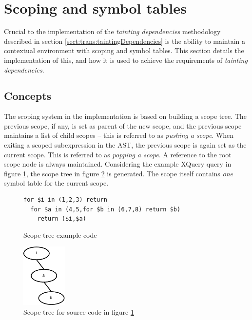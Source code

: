 \section{Scoping and symbol tables}
Crucial to the implementation of the \textit{tainting dependencies} methodology
described in section \ref{sect:trans:taintingDependencies} is the ability to
maintain a contextual environment with scoping and symbol tables. This section
details the implementation of this, and how it is used to achieve the
requirements of \textit{tainting dependencies}.

\subsection{Concepts}
The scoping system in the implementation is based on building a scope tree. The
previous scope, if any, is set as parent of the new scope, and the previous
scope maintains a list of child scopes -- this is referred to as
\textit{pushing a scope}. When exiting a scoped subexpression in the AST, the
previous scope is again set as the current scope. This is referred to as
\textit{popping a scope}. A reference to the root scope node is always
maintained. Considering the example XQuery query in figure
\ref{fig:impl:scope_tree_ex_code}, the scope tree in figure
\ref{fig:impl:scope_tree_ex} is generated. The scope itself contains \emph{one}
symbol table for the current scope.

\begin{figure}[!htp]
\begin{center}
\begin{Verbatim}
for $i in (1,2,3) return 
  for $a in (4,5,for $b in (6,7,8) return $b) 
    return ($i,$a)
\end{Verbatim}
  \caption{Scope tree example code}
  \label{fig:impl:scope_tree_ex_code}
\end{center}
\end{figure}

\begin{figure}[!htp]
\begin{center}
  \includegraphics[width=0.2\textwidth]{diagrams/scope_tree_ex}
  \caption{Scope tree for source code in figure
  \ref{fig:impl:scope_tree_ex_code}} 
  \label{fig:impl:scope_tree_ex}
\end{center}
\end{figure}

